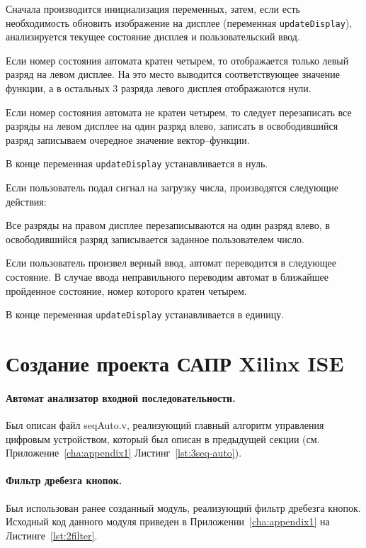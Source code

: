 Сначала производится инициализация переменных, затем, если есть необходимость обновить изображение на дисплее (переменная \texttt{updateDisplay}), анализируется текущее состояние дисплея и пользовательский ввод. 

Если номер состояния автомата кратен четырем, то отображается только левый разряд на левом дисплее. На это место выводится соответствующее значение функции, а в остальных 3 разряда левого дисплея отображаются нули.

Если номер состояния автомата не кратен четырем, то следует перезаписать все разряды на левом дисплее на один разряд влево, записать в освободившийся разряд записываем очередное значение вектор--функции. 

В конце переменная \texttt{updateDisplay} устанавливается в нуль. 

Если пользователь подал сигнал на загрузку числа, производятся следующие действия:

Все разряды на правом дисплее перезаписываются на один разряд влево, в освободившийся разряд записывается заданное пользователем число. 

Если пользователь произвел верный ввод, автомат переводится в следующее состояние. В случае ввода неправильного переводим автомат в ближайшее пройденное состояние, номер которого кратен четырем.

В конце переменная \texttt{updateDisplay} устанавливается в единицу. 

\section{Создание проекта САПР Xilinx ISE}

\paragraph{Автомат анализатор входной последовательности.}
Был описан файл seqAuto.v, реализующий главный алгоритм управления цифровым устройством, который был описан в предыдущей секции (см. Приложение~\ref{cha:appendix1} Листинг~\ref{lst:3seq-auto}).


\paragraph{Фильтр дребезга кнопок.}
Был использован ранее созданный модуль, реализующий фильтр дребезга кнопок.
Исходный код данного модуля приведен в Приложении~\ref{cha:appendix1} на Листинге~\ref{lst:2filter}.

